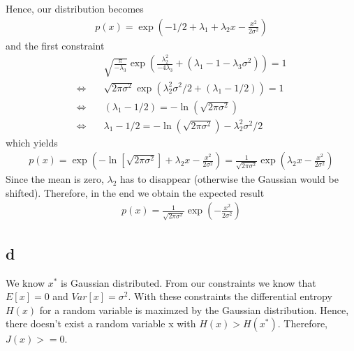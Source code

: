 Hence, our distribution becomes
\begin{align*}
p(x) = \exp(-1/2 + \lambda_1 + \lambda_2 x - \frac{x^2}{2\sigma^2})
\end{align*}
and the first constraint
\begin{align*}
& \sqrt{\frac{\pi}{-\lambda_3}}\exp\left(\frac{\lambda_2^2}{-4\lambda_3}+(\lambda_1-1 - \lambda_3\sigma^2)\right) = 1\\
\Leftrightarrow \quad &  \sqrt{2\pi\sigma^2}\exp\left(\lambda_2^2\sigma^2/2+(\lambda_1 - 1/2)\right) = 1\\
\Leftrightarrow \quad & (\lambda_1 - 1/2) = -\ln \left(\sqrt{2\pi\sigma^2}\right)\\
\Leftrightarrow \quad & \lambda_1 - 1/2 = -\ln \left(\sqrt{2\pi\sigma^2}\right) -\lambda_2^2\sigma^2/2
\end{align*}
which yields
\begin{align*}
p(x) = \exp\left(-\ln \left[\sqrt{2\pi\sigma^2}\right] + \lambda_2 x - \frac{x^2}{2\sigma^2}\right) = \frac{1}{\sqrt{2\pi\sigma^2}} \exp\left(\lambda_2 x - \frac{x^2}{2\sigma^2}\right)
\end{align*}
Since the mean is zero, $\lambda_2$ has to disappear (otherwise the Gaussian would be shifted). Therefore, in the end we obtain the expected result
\begin{align}
p(x) =  \frac{1}{\sqrt{2\pi\sigma^2}} \exp\left(- \frac{x^2}{2\sigma^2}\right)
\end{align}

\subsection*{d}

We know $x^{*}$ is Gaussian distributed. From our constraints we know that $E[x]
= 0$ and $Var[x] = \sigma^{2}$. With these constraints the differential entropy
$H(x)$ for a random variable is maximzed by the Gaussian distribution. Hence,
there doesn't exist a random variable x with $H(x)>H(x^*)$. Therefore, $J(x) >=
0 $.